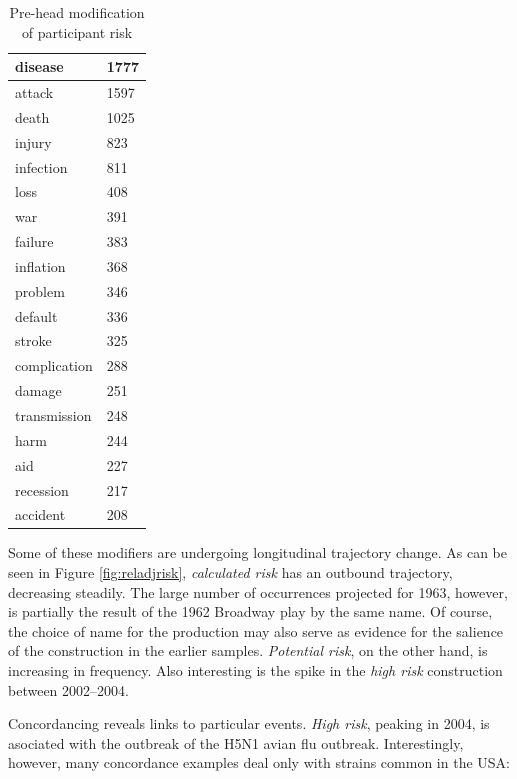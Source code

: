 \begin{table}
{\begin{minipage}{0.35\textwidth}
\begin{tabular}{|l|l|}
					disease            & 1777  \\ \hline
					attack             & 1597  \\ \hline
					death              & 1025  \\ \hline
					injury             & 823   \\ \hline
					infection          & 811   \\ \hline
					loss               & 408   \\ \hline
					war                & 391   \\ \hline
					failure            & 383   \\ \hline
					inflation          & 368   \\ \hline
					problem            & 346   \\ \hline
					default            & 336   \\ \hline
					stroke             & 325   \\ \hline
					complication       & 288   \\ \hline
					damage             & 251   \\ \hline
					transmission       & 248   \\ \hline
					harm               & 244   \\ \hline
					aid                & 227   \\ \hline
					recession          & 217   \\ \hline
					accident           & 208   \\ \hline
					\end{tabular}
					\caption{Pre-head modification of participant risk}
					\label{tab:posthead}
					\end{minipage}}
					\end{table}

				Some of these modifiers are undergoing longitudinal trajectory change. As can be seen in Figure \ref{fig:reladjrisk}, \emph{calculated risk} has an outbound trajectory, decreasing steadily. The large number of occurrences projected for 1963, however, is partially the result of the 1962 Broadway play by the same name. Of course, the choice of name for the production may also serve as evidence for the salience of the construction in the earlier samples.  \emph{Potential risk}, on the other hand, is increasing in frequency. Also interesting is the spike in the \emph{high risk} construction between 2002--2004. %

                Concordancing reveals links to particular events. \emph{High risk}, peaking in 2004, is asociated with the outbreak of the H5N1 avian flu outbreak. Interestingly, however, many concordance examples deal only with strains common in the USA:

